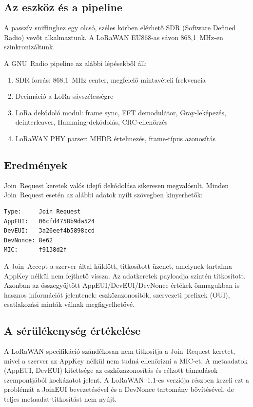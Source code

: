 \documentclass[12pt,a4paper]{article}
\begin{document}
\subsection{Az eszköz és a pipeline}

A passzív sniffinghez egy olcsó, széles körben elérhető SDR
(Software Defined Radio) vevőt alkalmaztunk.
A LoRaWAN EU868-as sávon 868,1~MHz-en szinkronizáltunk.

A GNU~Radio pipeline az alábbi lépésekből áll:
\begin{enumerate}
    \item SDR forrás: 868,1~MHz center, megfelelő mintavételi frekvencia
    \item Decimáció a LoRa sávszélességre
    \item LoRa dekódoló modul: frame sync, FFT demodulátor, Gray-leképezés,
    deinterleaver, Hamming-dekódolás, CRC-ellenőrzés
    \item LoRaWAN PHY parser: MHDR értelmezés, frame-típus azonosítás
\end{enumerate}

\subsection{Eredmények}

Join~Request keretek valós idejű dekódolása sikeresen megvalósult.
Minden Join~Request esetén az alábbi adatok nyílt szövegben kinyerhetők:

\needspace{6cm}
\begin{lstlisting}[caption={Dekódolt Join Request mezők -- passzív sniffing}]
Type:     Join Request
AppEUI:   06cfd4758b9da524
DevEUI:   3a26eef4b5898ccd
DevNonce: 8e62
MIC:      f9138d2f
\end{lstlisting}

A Join~Accept a szerver által küldött, titkosított üzenet, amelynek tartalma
AppKey nélkül nem fejthető vissza. Az adatkeretek payloadja szintén titkosított.
Azonban az összegyűjtött AppEUI/DevEUI/DevNonce értékek önmagukban is hasznos
információt jelentenek: eszközazonosítók, szervezeti prefixek (OUI), csatlakozási
minták válnak megfigyelhetővé.

\subsection{A sérülékenység értékelése}

A LoRaWAN specifikáció szándékosan nem titkosítja a Join~Request keretet,
mivel a szerver az AppKey nélkül nem tudná ellenőrizni a MIC-et.
A metaadatok (AppEUI, DevEUI) kitettsége az eszközazonosítás és célzott
támadások szempontjából kockázatot jelent. A LoRaWAN~1.1-es verziója
részben kezeli ezt a problémát a JoinEUI bevezetésével és a DevNonce
tartomány bővítésével, de teljes metaadat-titkosítást nem nyújt.
\end{document}
